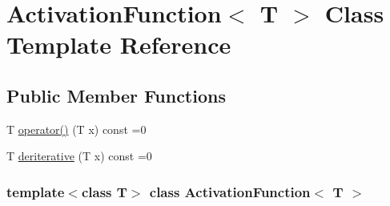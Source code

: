 \hypertarget{class_activation_function}{\section{\-Activation\-Function$<$ \-T $>$ \-Class \-Template \-Reference}
\label{class_activation_function}
}
\subsection*{\-Public \-Member \-Functions}
\begin{DoxyCompactItemize}
\item 
\-T \hyperlink{class_activation_function_a34df0907340f36e41d5a1fd60a015036}{operator()} (\-T x) const =0
\item 
\-T \hyperlink{class_activation_function_a6916cffe74a85a7737b032e8977d3192}{deriterative} (\-T x) const =0
\end{DoxyCompactItemize}
\subsubsection*{template$<$class T$>$ class Activation\-Function$<$ T $>$}



